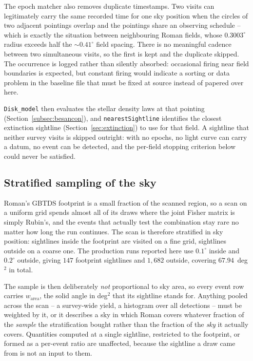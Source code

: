 \documentclass[english,10pt,a4paper]{article}
\begin{document}
	The epoch matcher also removes duplicate timestamps. Two visits can legitimately carry the same recorded time for one sky position when the circles of two adjacent pointings overlap and the pointings share an observing schedule -- which is exactly the situation between neighbouring Roman fields, whose $0.3003^{\circ}$ radius exceeds half the $\sim0.41^{\circ}$ field spacing. There is no meaningful cadence between two simultaneous visits, so the first is kept and the duplicate skipped. The occurrence is logged rather than silently absorbed: occasional firing near field boundaries is expected, but constant firing would indicate a sorting or data problem in the baseline file that must be fixed at source instead of papered over here.

	\texttt{Disk\_model} then evaluates the stellar density laws at that pointing (Section~\ref{subsec:besancon}), and \texttt{nearestSightline} identifies the closest extinction sightline (Section~\ref{sec:extinction}) to use for that field. A sightline that neither survey visits is skipped outright: with no epochs, no light curve can carry a datum, no event can be detected, and the per-field stopping criterion below could never be satisfied.
	
	\subsection{Stratified sampling of the sky}
	\label{subsec:stratification}

	Roman's GBTDS footprint is a small fraction of the scanned region, so a scan on a uniform grid spends almost all of its draws where the joint Fisher matrix is simply Rubin's, and the events that actually test the combination stay rare no matter how long the run continues. The scan is therefore stratified in sky position: sightlines inside the footprint are visited on a fine grid, sightlines outside on a coarse one. The production runs reported here use $0.1^{\circ}$ inside and $0.2^{\circ}$ outside, giving $147$ footprint sightlines and $1{,}682$ outside, covering $67.94$~deg$^2$ in total.

	The sample is then deliberately \emph{not} proportional to sky area, so every event row carries $w_{\mathrm{area}}$, the solid angle in deg$^2$ that its sightline stands for. Anything pooled across the scan -- a survey-wide yield, a histogram over all detections -- must be weighted by it, or it describes a sky in which Roman covers whatever fraction of the \emph{sample} the stratification bought rather than the fraction of the \emph{sky} it actually covers. Quantities computed at a single sightline, restricted to the footprint, or formed as a per-event ratio are unaffected, because the sightline a draw came from is not an input to them.
\end{document}
